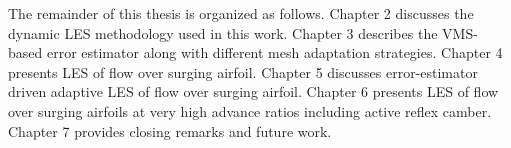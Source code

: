 The remainder of this thesis is organized as follows.
Chapter 2 discusses the dynamic LES methodology used in this work. 
Chapter 3 describes the VMS-based error estimator along with different mesh adaptation strategies.
Chapter 4 presents LES of flow over surging airfoil.
Chapter 5 discusses error-estimator driven adaptive LES of flow over surging airfoil.
Chapter 6 presents LES of flow over surging airfoils at very high advance ratios including active reflex camber.
Chapter 7 provides closing remarks and future work.